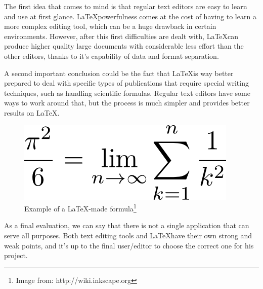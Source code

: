The first idea that comes to mind is that regular text editors are easy to learn and use at first glance. \LaTeX powerfulness comes at the cost of having to learn a more complex editing tool, which can be a huge drawback in certain environments. However, after this first difficulties are dealt with, \LaTeX can produce higher quality large documents with considerable less effort than the other editors, thanks to it's capability of data and format separation.

A second important conclusion could be the fact that \LaTeX is way better prepared to deal with specific types of publications that require special writing techniques, such as handling scientific formulas. Regular text editors have some ways to work around that, but the process is much simpler and provides better results on \LaTeX.

\begin{figure}[H]
  \centering
  \includegraphics[scale=0.5]{Chapters/LaTeXFormulaEffect.png}
  \caption{ Example of a \LaTeX-made formula\footnote{Image from: http://wiki.inkscape.org} }
  \label{fig:LaTeX-formula-example}
\end{figure}

As a final evaluation, we can say that there is not a single application that can serve all purposes. Both text editing tools and \LaTeX have their own strong and weak points, and it's up to the final user/editor to choose the correct one for his project.

